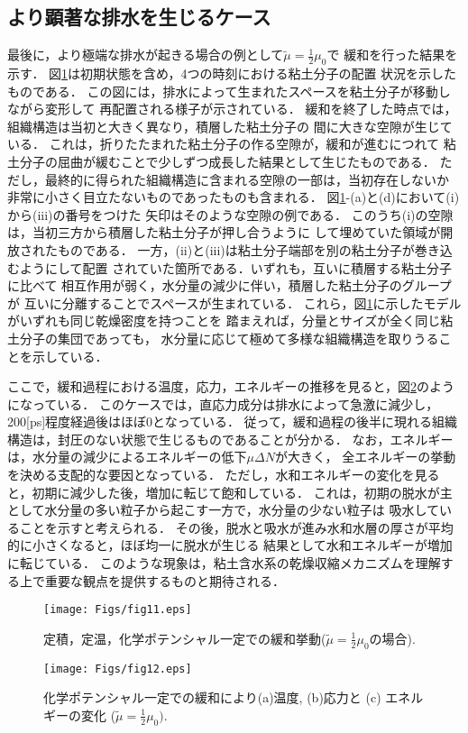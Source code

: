 \subsection{より顕著な排水を生じるケース}
最後に，より極端な排水が起きる場合の例として$\tilde \mu =\frac{1}{2}\mu_0$で
緩和を行った結果を示す．
図\ref{fig:fig11}は初期状態を含め，4つの時刻における粘土分子の配置
状況を示したものである．
この図には，排水によって生まれたスペースを粘土分子が移動しながら変形して
再配置される様子が示されている．
緩和を終了した時点では，組織構造は当初と大きく異なり，積層した粘土分子の
間に大きな空隙が生じている．
これは，折りたたまれた粘土分子の作る空隙が，緩和が進むにつれて
粘土分子の屈曲が緩むことで少しずつ成長した結果として生じたものである．
ただし，最終的に得られた組織構造に含まれる空隙の一部は，当初存在しないか
非常に小さく目立たないものであったものも含まれる．
図\ref{fig:fig11}-(a)と(d)において(i)から(iii)の番号をつけた
矢印はそのような空隙の例である．
このうち(i)の空隙は，当初三方から積層した粘土分子が押し合うように
して埋めていた領域が開放されたものである．
一方，(ii)と(iii)は粘土分子端部を別の粘土分子が巻き込むようにして配置
されていた箇所である．いずれも，互いに積層する粘土分子に比べて
相互作用が弱く，水分量の減少に伴い，積層した粘土分子のグループが
互いに分離することでスペースが生まれている．
これら，図\ref{fig:fig11}に示したモデルがいずれも同じ乾燥密度を持つことを
踏まえれば，分量とサイズが全く同じ粘土分子の集団であっても，
水分量に応じて極めて多様な組織構造を取りうることを示している．

ここで，緩和過程における温度，応力，エネルギーの推移を見ると，図\ref{fig:fig12}のようになっている．
このケースでは，直応力成分は排水によって急激に減少し，200[ps]程度経過後はほぼ0となっている．
従って，緩和過程の後半に現れる組織構造は，封圧のない状態で生じるものであることが分かる．
なお，エネルギーは，水分量の減少によるエネルギーの低下$\mu \Delta N$が大きく，
全エネルギーの挙動を決める支配的な要因となっている．
ただし，水和エネルギーの変化を見ると，初期に減少した後，増加に転じて飽和している．
これは，初期の脱水が主として水分量の多い粒子から起こす一方で，水分量の少ない粒子は
吸水していることを示すと考えられる．
その後，脱水と吸水が進み水和水層の厚さが平均的に小さくなると，ほぼ均一に脱水が生じる
結果として水和エネルギーが増加に転じている．
このような現象は，粘土含水系の乾燥収縮メカニズムを理解する上で重要な観点を提供するものと期待される．
\begin{figure}[h]
	\begin{center}
	\texttt{[image: Figs/fig11.eps]} 
	\end{center}
	\caption{
		定積，定温，化学ポテンシャル一定での緩和挙動($\tilde \mu =\frac{1}{2}\mu_0$の場合).
	} 
	\label{fig:fig11}
\end{figure}
\begin{figure}[h]
	\begin{center}
	\texttt{[image: Figs/fig12.eps]} 
	\end{center}
	\caption{
		化学ポテンシャル一定での緩和により(a)温度, (b)応力と (c) エネルギーの変化
		($\tilde \mu =\frac{1}{2}\mu_0).$
	} 
	\label{fig:fig12}
\end{figure}

